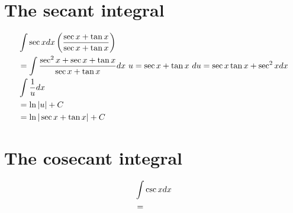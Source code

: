 \documentclass[11pt]{article}
\newcommand*{\set}{\setcounter{equation}{0}}
\newcommand*{\lt}{\left}
\newcommand*{\rt}{\right}
\begin{document}
\section{The secant integral}
\begin{align}
    \set
    &\int\sec xdx\lt(\frac{\sec x+\tan x}{\sec x+\tan x}\rt)\\
    &=\int\frac{\sec^2 x+\sec x+\tan x}{\sec x+\tan x}dx\,\, u=\sec x+\tan x\,\, du=\sec x\tan x+\sec^2xdx\\
    &\int\frac{1}{u}dx\\
    &=\ln|u|+C\\
    &=\ln|\sec x+\tan x|+C
\end{align}

\section{The cosecant integral}
\begin{align}
    \set
    &\int\csc xdx\\
    &=
\end{align}
\end{document}
